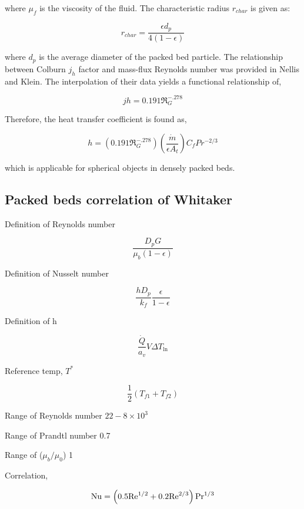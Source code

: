where $\mu_f$ is the viscosity of the fluid.  The characteristic radius $r_{char}$ is given as:

\begin{equation}
	r_{char}=\frac{\epsilon d_p}{4(1-\epsilon)}
\end{equation}

where $d_p$ is the average diameter of the packed bed particle. The relationship between Colburn $j_h$ factor and mass-flux Reynolds number was provided in Nellis and Klein. The interpolation of their data yields a functional relationship of,

\begin{equation}
	jh=0.191 \Re_G^{-.278}
\end{equation}

Therefore, the heat transfer coefficient is found as,

\begin{equation}
	h=(0.191 \Re_G^{-.278}) (\frac{\dot{m}}{\epsilon A_t}) C_f Pr^{-2/3}
\end{equation}

which is applicable for spherical objects in densely packed beds.

\subsection{Packed beds correlation of Whitaker}

Definition of Reynolds number

\begin{equation}
	\frac{D_p G}{\mu_b(1-\epsilon)}
\end{equation}

Definition of Nusselt number

\begin{equation}
	\frac{hD_p}{k_f}\frac{\epsilon}{1-\epsilon}
\end{equation}

Definition of h

\begin{equation}
	\frac{\dot{Q}}{a_v}V\Delta T_\ln
\end{equation}

Reference temp, $T^*$

\begin{equation}
	\frac{1}{2}(T_{f1} + T_{f2})
\end{equation}

Range of Reynolds number
$22-8 \times 10^3$

Range of Prandtl number
0.7

Range of ($\mu_b/\mu_0$)
1

Correlation,

\begin{equation}
	\mathrm{Nu} = \left( 0.5 \mathrm{Re}^{1/2} + 0.2\mathrm{Re}^{2/3} \right)\mathrm{Pr}^{1/3}
\end{equation}